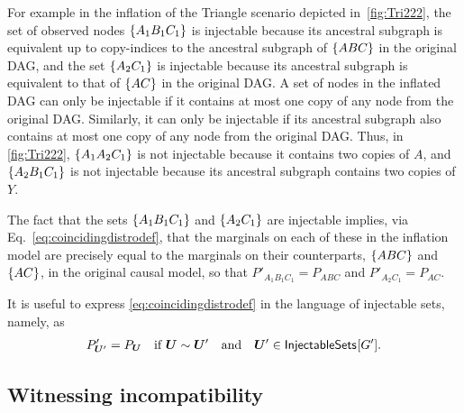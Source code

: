 For example in the inflation of the Triangle scenario depicted in~\cref{fig:Tri222}, the set of observed nodes $\left\lbrace A_1 B_1 C_1\right\rbrace$ is injectable because its ancestral subgraph is equivalent up to copy-indices to the ancestral subgraph of $\left\lbrace A B C\right\rbrace$ in the original DAG, and the set $\left\lbrace A_2 C_1\right\rbrace$ is injectable because its ancestral subgraph is equivalent to that of $\left\lbrace A C\right\rbrace$ in the original DAG. A set of nodes in the inflated DAG can only be injectable if it contains at most one copy of any node from the original DAG. Similarly, it can only be injectable if its ancestral subgraph also contains at most one copy of any node from the original DAG.  
Thus, in \cref{fig:Tri222}, $\left\lbrace A_1 A_2 C_1\right\rbrace$ is not injectable because it contains two copies of $A$, and $\left\lbrace A_2 B_1 C_1\right\rbrace$ is not injectable because its ancestral subgraph contains two copies of $Y$. 

The fact that the sets $\left\lbrace A_1 B_1 C_1\right\rbrace$ and $\left\lbrace A_2 C_1\right\rbrace$ are injectable implies, via Eq.~\eqref{eq:coincidingdistrodef}, that the marginals on each of these in the inflation model are precisely equal to the marginals on their counterparts, $\left\lbrace A B C\right\rbrace$ and $\left\lbrace A C\right\rbrace$, in the original causal model, so that $P'_{A_1 B_1 C_1} = P_{A B C}$ and $P'_{A_2 C_1} = P_{A C}$.

It is useful to express \cref{eq:coincidingdistrodef} in the language of injectable sets, namely, as 
\begin{align}\label{keyinference}
P'_{\bm{U}'}=P_{\bm{U}}\quad\text{if }  \bm{U} \sim \bm{U}'\quad \text{and} \quad \bm{U}'\in\SmallNamedFunction{InjectableSets}{G'}.%
\end{align}

\subsection{Witnessing incompatibility\label{subsec:witnessingincompat}}

